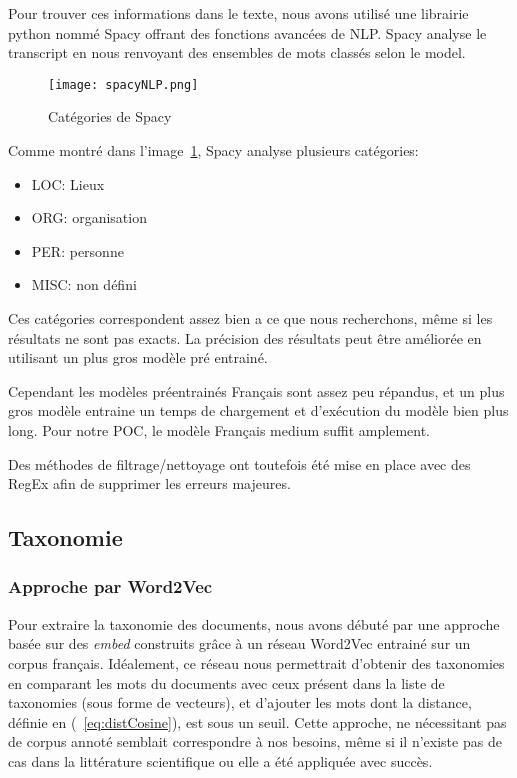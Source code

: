 Pour trouver ces informations dans le texte, nous avons utilisé une librairie python nommé Spacy offrant des fonctions avancées de NLP\@.
Spacy analyse le transcript en nous renvoyant des ensembles de mots classés selon le model.


\begin{figure}[h!]
  \centering
  \texttt{[image: spacyNLP.png]}
	\caption[]{Catégories de Spacy}
	\label{fig:spacyNLP}
\end{figure}

Comme montré dans l'image~\ref{fig:spacyNLP}, Spacy analyse plusieurs catégories:
\begin{itemize}
\item LOC\@: Lieux
\item ORG\@: organisation
\item PER\@: personne
\item MISC\@: non défini
\end{itemize}

Ces catégories correspondent assez bien a ce que nous recherchons, même si les résultats ne sont pas exacts.
La précision des résultats peut être améliorée en utilisant un plus gros modèle pré entrainé.

Cependant les modèles préentrainés Français sont assez peu répandus, et un plus gros modèle entraine un temps de chargement et d'exécution du modèle bien plus long.
Pour notre POC, le modèle Français medium suffit amplement.

Des méthodes de filtrage/nettoyage ont toutefois été mise en place avec des RegEx afin de supprimer les erreurs majeures.

\subsection{Taxonomie}%
\subsubsection{Approche par Word2Vec\label{word2vecReal}}
Pour extraire la taxonomie des documents, nous avons débuté par une approche basée sur des \textit{\gls{embed}} construits grâce à un réseau Word2Vec entrainé sur un corpus français.
Idéalement, ce réseau nous permettrait d'obtenir des taxonomies en comparant les mots du documents avec ceux présent dans la liste de taxonomies (sous forme de vecteurs), et d'ajouter les mots dont la distance, définie en (~\ref{eq:distCosine}), est sous un seuil.
Cette approche, ne nécessitant pas de corpus annoté semblait correspondre à nos besoins, même si il n'existe pas de cas dans la littérature scientifique ou elle a été appliquée avec succès. %


